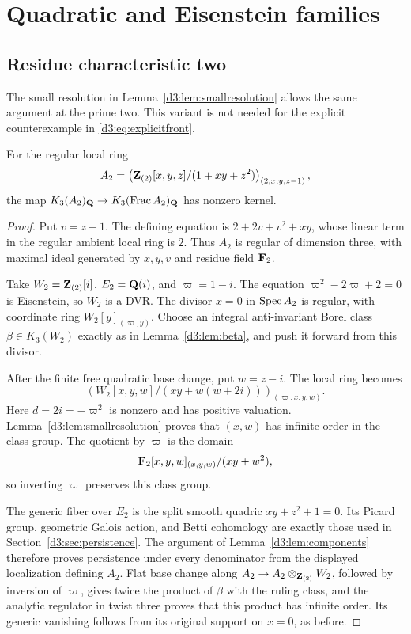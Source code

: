 \section{Quadratic and Eisenstein families}\label{d3:sec:families}

\subsection{Residue characteristic two}\label{d3:sec:two}

The small resolution in Lemma~\ref{d3:lem:smallresolution} allows the same argument at the prime two. This variant is not needed for the explicit counterexample in \eqref{d3:eq:explicitfront}.

\begin{proposition}\label{d3:prop:two}
For the regular local ring
\[
A_2=\left(\mathbf Z_{(2)}[x,y,z]/(1+xy+z^2)\right)_{(2,x,y,z-1)},
\]
the map $K_3(A_2)_{\mathbf Q}\to K_3(\operatorname{Frac} A_2)_{\mathbf Q}$ has nonzero kernel.
\end{proposition}
\begin{proof}
Put $v=z-1$. The defining equation is $2+2v+v^2+xy$, whose linear term in the regular ambient local ring is $2$. Thus $A_2$ is regular of dimension three, with maximal ideal generated by $x,y,v$ and residue field $\mathbf F_2$.

Take $W_2=\mathbf Z_{(2)}[i]$, $E_2=\mathbf Q(i)$, and $\varpi=1-i$. The equation $\varpi^2-2\varpi+2=0$ is Eisenstein, so $W_2$ is a DVR. The divisor $x=0$ in $\operatorname{Spec} A_2$ is regular, with coordinate ring $W_2[y]_{(\varpi,y)}$. Choose an integral anti-invariant Borel class $\beta\in K_3(W_2)$ exactly as in Lemma~\ref{d3:lem:beta}, and push it forward from this divisor.

After the finite free quadratic base change, put $w=z-i$. The local ring becomes
\[
\left(W_2[x,y,w]/(xy+w(w+2i))\right)_{(\varpi,x,y,w)}.
\]
Here $d=2i=-\varpi^2$ is nonzero and has positive valuation. Lemma~\ref{d3:lem:smallresolution} proves that $(x,w)$ has infinite order in the class group. The quotient by $\varpi$ is the domain
\[
\mathbf F_2[x,y,w]_{(x,y,w)}/(xy+w^2),
\]
so inverting $\varpi$ preserves this class group.

The generic fiber over $E_2$ is the split smooth quadric $xy+z^2+1=0$. Its Picard group, geometric Galois action, and Betti cohomology are exactly those used in Section~\ref{d3:sec:persistence}. The argument of Lemma~\ref{d3:lem:components} therefore proves persistence under every denominator from the displayed localization defining $A_2$. Flat base change along $A_2\to A_2\otimes_{\mathbf Z_{(2)}}W_2$, followed by inversion of $\varpi$, gives twice the product of $\beta$ with the ruling class, and the analytic regulator in twist three proves that this product has infinite order. Its generic vanishing follows from its original support on $x=0$, as before.
\end{proof}

